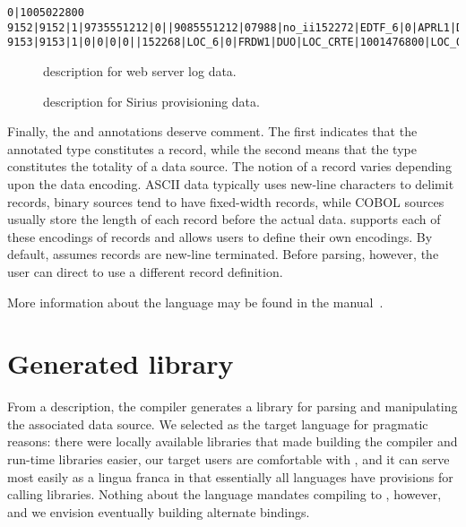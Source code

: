 \documentclass{sig-alternate}
\newcommand{\dibbler}{Sirius}
\begin{document}
\begin{figure*}
\begin{small}
\begin{center}
\begin{verbatim}
0|1005022800
9152|9152|1|9735551212|0||9085551212|07988|no_ii152272|EDTF_6|0|APRL1|DUO|10|1000295291
9153|9153|1|0|0|0|0||152268|LOC_6|0|FRDW1|DUO|LOC_CRTE|1001476800|LOC_OS_10|1001649601
\end{verbatim}
\caption{Tiny example of \dibbler{} provisioning data.}
\label{figure:dibbler-records}
\end{center}
\end{small}
\end{figure*}


\begin{figure}

\caption{\pads{} description for web server log data.}
\label{figure:wsl}
\end{figure}

\begin{figure}

\caption{\pads{} description for \dibbler{} provisioning data.}
\label{figure:dibbler}
\end{figure}


Finally, the  and  annotations deserve comment.  The first
indicates that the annotated type constitutes a record,
while the second means that the type constitutes the totality of a data source.  
The notion of a record varies depending upon the data encoding.  
ASCII data typically uses new-line characters to delimit 
records, binary sources tend to have fixed-width records, while 
COBOL sources usually store the length of each record before the actual data.
\pads{} supports each of these encodings of records and allows users to define
their own encodings.  By default, \pads{} assumes records are new-line terminated.
Before parsing, however, the user can direct \pads{} to use a different record
definition.

More information about the \pads{} language may be found in the
\pads{} manual~\cite{padsmanual}.

\section{Generated library}
From a \pads{} description, the \pads{} compiler generates a \C{} library
for parsing and manipulating the associated data source.  We selected \C{}
as the target language for pragmatic reasons: there were locally available
libraries that made building the compiler and run-time libraries easier,
our target users are comfortable with \C{}, and it can serve most easily
as a lingua franca in that essentially all languages have provisions for 
calling \C{} libraries.  Nothing about the \pads{} language mandates compiling
to \C{}, however, and we envision eventually building alternate bindings.
\end{document}
